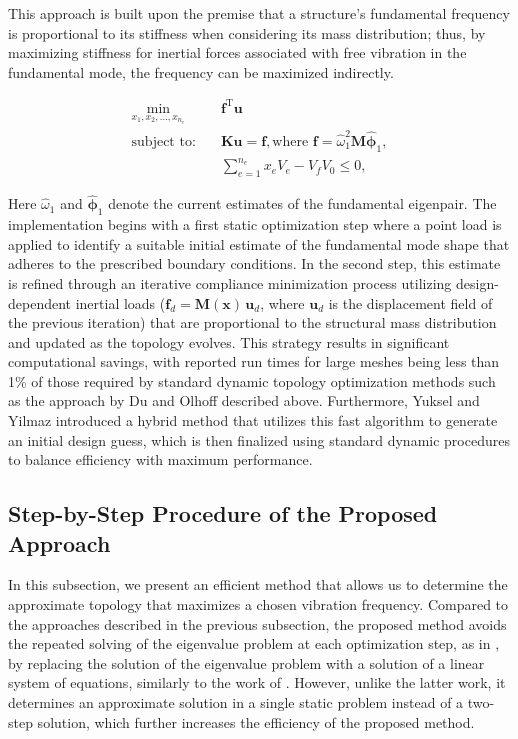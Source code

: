 \documentclass[applsci,article,submit,pdftex,moreauthors]{Definitions/mdpi}
\begin{document}
This approach is built upon the premise that a structure's fundamental frequency is proportional to its stiffness when considering its mass distribution; thus, by maximizing stiffness for inertial forces associated with free vibration in the fundamental mode, the frequency can be maximized indirectly.

\begin{align*}
\min_{x_1,x_2,\dots,x_{n_e}} \quad & \mathbf{f}^{\mathrm{T}} \mathbf{u} \\[8pt]
\text{subject to:} \quad & \mathbf{K}\mathbf{u} = \mathbf{f}, \text{where } \mathbf{f} = \hat{\omega}_1^2 \mathbf{M}\hat{\boldsymbol{\phi}}_1, \\[4pt]
& \sum_{e=1}^{n_e} x_e V_e - V_f V_0 \le 0,
\end{align*}

Here $\hat{\omega}_1$ and $\hat{\boldsymbol{\phi}}_1$ denote the current estimates of the fundamental eigenpair. The implementation begins with a first static optimization step where a point load is applied to identify a suitable initial estimate of the fundamental mode shape that adheres to the prescribed boundary conditions. In the second step, this estimate is refined through an iterative compliance minimization process utilizing design-dependent inertial loads ($\mathbf{f}_d = \mathbf{M}(\mathbf{x})\,\mathbf{u}_d$, where $\mathbf{u}_d$ is the displacement field of the previous iteration) that are proportional to the structural mass distribution and updated as the topology evolves. This strategy results in significant computational savings, with reported run times for large meshes being less than 1\% of those required by standard dynamic topology optimization methods such as the approach by Du and Olhoff described above. Furthermore, Yuksel and Yilmaz introduced a hybrid method that utilizes this fast algorithm to generate an initial design guess, which is then finalized using standard dynamic procedures to balance efficiency with maximum performance.

\subsection{Step-by-Step Procedure of the Proposed Approach}
In this subsection, we present an efficient method that allows us to determine the approximate topology that maximizes a chosen vibration frequency. Compared to the approaches described in the previous subsection, the proposed method avoids the repeated solving of the eigenvalue problem at each optimization step, as in \citet{DU2007}, by replacing the solution of the eigenvalue problem with a solution of a linear system of equations, similarly to the work of \citet{YUKSEL2025}. However, unlike the latter work, it determines an approximate solution in a single static problem instead of a two-step solution, which further increases the efficiency of the proposed method.
\end{document}
